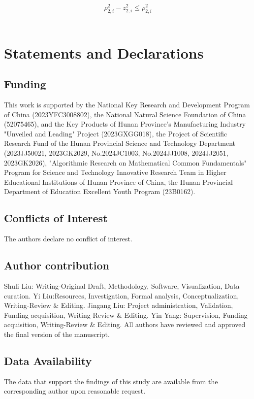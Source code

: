 \documentclass[pdflatex,sn-mathphys-num]{sn-jnl}%
\theoremstyle{thmstyleone}%
\theoremstyle{thmstyletwo}%
\theoremstyle{thmstylethree}%
\begin{document}
$$
\rho_{2,i}^2 - z_{2,i}^2 \le \rho_{2,i}^2
$$

\begin{equation}\label{eq:45}
	\begin{aligned}


	\end{aligned}
\end{equation}

% 
% 

% 
\section*{Statements and Declarations}
\subsection*{Funding}

This work is supported by the National Key Research and Development Program of China (2023YFC3008802), the National Natural Science Foundation of China (52075465), and the Key Products of Hunan Province's Manufacturing Industry "Unveiled and Leading" Project (2023GXGG018), the Project of Scientific Research Fund of the Hunan Provincial Science and Technology Department (2023JJ50021, 2023GK2029, No.2024JC1003, No.2024JJ1008, 2024JJ2051, 2023GK2026), "Algorithmic Research on Mathematical Common Fundamentals" Program for Science and Technology Innovative Research Team in Higher Educational Institutions of Hunan Province of China, the Hunan Provincial Department of Education Excellent Youth Program (23B0162).

\subsection*{Conflicts of Interest}
The authors declare no conflict of interest.

\subsection*{Author contribution}
Shuli Liu: Writing-Original Draft, Methodology, Software, Visualization, Data curation. Yi Liu:Resources, Investigation, Formal analysis, Conceptualization, Writing-Review \& Editing. 
Jingang Liu: Project administration, Validation, Funding acquisition, Writing-Review \& Editing. 
Yin Yang: Supervision, Funding acquisition, Writing-Review \& Editing. 
All authors have reviewed and approved the final version of the manuscript.
\subsection*{Data Availability}
The data that support the findings of this study are available from the corresponding author upon reasonable request.
\end{document}
